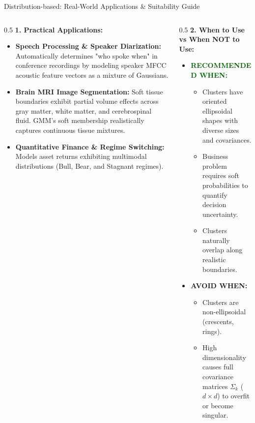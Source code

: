 \documentclass[aspectratio=169,10pt]{beamer}
\begin{document}
\begin{frame}{Distribution-based: Real-World Applications \& Suitability Guide}
  \small
  \begin{columns}[T]
    \begin{column}{0.5\textwidth}
      \textbf{1. Practical Applications:}
      \begin{itemize}\setlength{\itemsep}{2pt}
        \item \textbf{Speech Processing \& Speaker Diarization:}
          Automatically determines "who spoke when" in conference recordings by modeling speaker MFCC acoustic feature vectors as a mixture of Gaussians.
        \item \textbf{Brain MRI Image Segmentation:}
          Soft tissue boundaries exhibit partial volume effects across gray matter, white matter, and cerebrospinal fluid. GMM's soft membership realistically captures continuous tissue mixtures.
        \item \textbf{Quantitative Finance \& Regime Switching:}
          Models asset returns exhibiting multimodal distributions (Bull, Bear, and Stagnant regimes).
      \end{itemize}
    \end{column}
    \begin{column}{0.5\textwidth}
      \textbf{2. When to Use vs When NOT to Use:}
      \begin{itemize}\setlength{\itemsep}{2pt}
        \item \textcolor{darkgreen}{\textbf{RECOMMENDED WHEN:}}
          \begin{itemize}
            \item Clusters have oriented ellipsoidal shapes with diverse sizes and covariances.
            \item Business problem requires soft probabilities to quantify decision uncertainty.
            \item Clusters naturally overlap along realistic boundaries.
          \end{itemize}
        \item \textcolor{crimsonred}{\textbf{AVOID WHEN:}}
          \begin{itemize}
            \item Clusters are non-ellipsoidal (crescents, rings).
            \item High dimensionality causes full covariance matrices $\Sigma_k$ ($d \times d$) to overfit or become singular.
          \end{itemize}
      \end{itemize}
    \end{column}
  \end{columns}
\end{frame}
\end{document}
